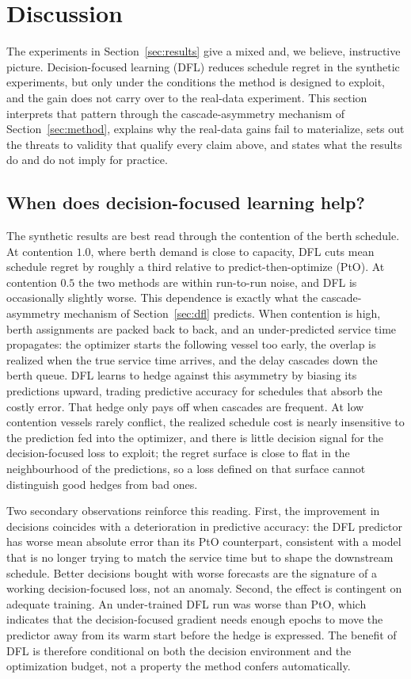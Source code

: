 \section{Discussion}\label{sec:discussion}

The experiments in Section~\ref{sec:results} give a mixed and, we believe,
instructive picture. Decision-focused learning (DFL) reduces schedule regret in
the synthetic experiments, but only under the conditions the method is designed
to exploit, and the gain does not carry over to the real-data experiment. This
section interprets that pattern through the cascade-asymmetry mechanism of
Section~\ref{sec:method}, explains why the real-data gains fail to materialize,
sets out the threats to validity that qualify every claim above, and states what
the results do and do not imply for practice.

\subsection{When does decision-focused learning help?}\label{sec:disc-when}

The synthetic results are best read through the contention of the berth
schedule. At contention $1.0$, where berth demand is close to capacity, DFL cuts
mean schedule regret by roughly a third relative to predict-then-optimize (PtO).
At contention $0.5$ the two methods are within run-to-run noise, and DFL is
occasionally slightly worse. This dependence is exactly what the
cascade-asymmetry mechanism of Section~\ref{sec:dfl} predicts. When contention is
high, berth assignments are packed back to back, and an under-predicted service
time propagates: the optimizer starts the following vessel too early, the overlap
is realized when the true service time arrives, and the delay cascades down the
berth queue. DFL learns to hedge against this asymmetry by biasing its
predictions upward, trading predictive accuracy for schedules that absorb the
costly error. That hedge only pays off when cascades are frequent. At low
contention vessels rarely conflict, the realized schedule cost is nearly
insensitive to the prediction fed into the optimizer, and there is little
decision signal for the decision-focused loss to exploit; the regret surface is
close to flat in the neighbourhood of the predictions, so a loss defined on that
surface cannot distinguish good hedges from bad ones.

Two secondary observations reinforce this reading. First, the improvement in
decisions coincides with a deterioration in predictive accuracy: the DFL
predictor has worse mean absolute error than its PtO counterpart, consistent with
a model that is no longer trying to match the service time but to shape the
downstream schedule. Better decisions bought with worse forecasts are the
signature of a working decision-focused loss, not an anomaly. Second, the effect
is contingent on adequate training. An under-trained DFL run was worse than PtO,
which indicates that the decision-focused gradient needs enough epochs to move
the predictor away from its warm start before the hedge is expressed. The benefit
of DFL is therefore conditional on both the decision environment and the
optimization budget, not a property the method confers automatically.

